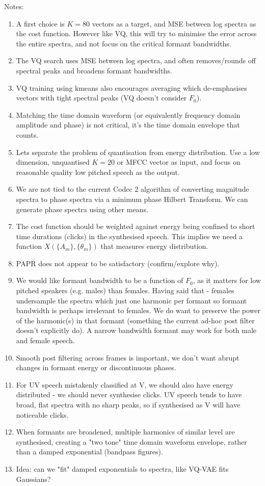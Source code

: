 \documentclass{article}
\begin{document}
Notes:
\begin{enumerate}
\item A first choice is $K=80$ vectors as a target, and MSE between log spectra as the cost function.  However like VQ, this will try to minimise the error across the entire spectra, and not focus on the critical formant bandwidths.
\item The VQ search uses MSE between log spectra, and often removes/rounds off spectral peaks and broadens formant bandwidths.  
\item VQ training using kmeans also encourages averaging which de-emphasises vectors with tight spectral peaks (VQ doesn't consider $F_0$).
\item Matching the time domain waveform (or equivalently frequency domain amplitude and phase) is not critical, it's the time domain envelope that counts.
\item Lets separate the problem of quantisation from energy distribution.  Use a low dimension, unquantised $K=20$ or MFCC vector as input, and focus on reasonable quality low pitched speech as the output.
\item We are not tied to the current Codec 2 algorithm of converting magnitude spectra to phase spectra via a minimum phase Hilbert Transform.  We can generate phase spectra using other means.
\item The cost function should be weighted against energy being confined to short time durations (clicks) in the synthesised speech.  This implies we need a function $X(\{A_m\},\{\theta_m\})$ that measures energy distribution.
\item PAPR does not appear to be satisfactory (confirm/explore why).
\item We would like formant bandwidth to be a function of $F_0$, as it matters for low pitched speakers (e.g. males) than females.  Having said that - females undersample the spectra which just one harmonic per formant so formant bandwidth is perhaps irrelevant to females.  We do want to preserve the power of the harmonic(s) in that formant (something the current ad-hoc post filter doesn't explicitly do).  A narrow bandwidth formant may work for both male and female speech.
\item Smooth post filtering across frames is important, we don't want abrupt changes in formant energy or discontinuous phases.
\item For UV speech mistakenly classified at V, we should also have energy distributed - we should never synthesise clicks.  UV speech tends to have broad, flat spectra with no sharp peaks, so if synthesised as V will have noticeable clicks.
\item When formants are broadened, multiple harmonics of similar level are synthesised, creating a "two tone" time domain waveform envelope, rather than a damped exponential (bandpass figures).
\item Idea: can we "fit" damped exponentials to spectra, like VQ-VAE fits Gaussians?
\end{enumerate}
\end{document}
